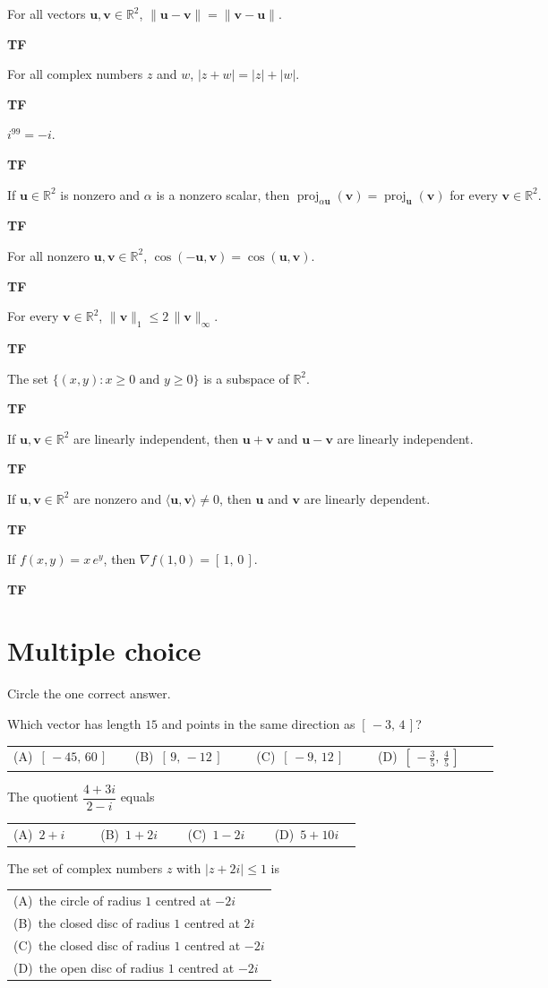\documentclass[11pt]{article}
\makeatletter
\newcommand{\tf}[1]{\parbox[t]{\dimexpr\linewidth-5.5em}{#1}%
  \hfill\textsf{\textbf{T}\qquad\textbf{F}}}
\newcommand{\fourch}[4]{\par\smallskip\noindent
  \begin{tabular}{@{}*{4}{>{\raggedright\arraybackslash}p{0.22\linewidth}}@{}}
  (A)\ #1 & (B)\ #2 & (C)\ #3 & (D)\ #4
  \end{tabular}\par}
\newcommand{\stackch}[4]{\par\smallskip\noindent
  \begin{tabular}{@{}l@{}}
  (A)\ #1 \\[3pt] (B)\ #2 \\[3pt] (C)\ #3 \\[3pt] (D)\ #4
  \end{tabular}\par}
\newcommand{\R}{\mathbb{R}}
\newcommand{\vc}[1]{\mathbf{#1}}
\newcommand{\norm}[1]{\lVert #1\rVert}
\newcommand{\ip}[2]{\langle #1,#2\rangle}
\newcommand{\proj}[2]{\operatorname{proj}_{#1}(#2)}
\newcommand{\grad}{\nabla}
\makeatother
\begin{document}
\begin{tfitems}
  \item \tf{For all vectors $\vc{u},\vc{v}\in\R^{2}$,
        $\norm{\vc{u}-\vc{v}}=\norm{\vc{v}-\vc{u}}$.}
        \vfill
  \item \tf{For all complex numbers $z$ and $w$,
        $\lvert z+w\rvert=\lvert z\rvert+\lvert w\rvert$.}
        \vfill
  \item \tf{$i^{99}=-i$.}
        \vfill
  \item \tf{If $\vc{u}\in\R^{2}$ is nonzero and $\alpha$ is a nonzero scalar,
        then $\proj{\alpha\vc{u}}{\vc{v}}=\proj{\vc{u}}{\vc{v}}$ for every
        $\vc{v}\in\R^{2}$.}
        \vfill
  \item \tf{For all nonzero $\vc{u},\vc{v}\in\R^{2}$,
        $\cos(-\vc{u},\vc{v})=\cos(\vc{u},\vc{v})$.}
        \vfill
\end{tfitems}

\newpage
\begin{tfitems}[start=6]
  \item \tf{For every $\vc{v}\in\R^{2}$,
        $\norm{\vc{v}}_1\le2\,\norm{\vc{v}}_\infty$.}
        \vfill
  \item \tf{The set $\{(x,y) : x\ge0 \text{ and } y\ge0\}$ is a subspace of
        $\R^{2}$.}
        \vfill
  \item \tf{If $\vc{u},\vc{v}\in\R^{2}$ are linearly independent, then
        $\vc{u}+\vc{v}$ and $\vc{u}-\vc{v}$ are linearly independent.}
        \vfill
  \item \tf{If $\vc{u},\vc{v}\in\R^{2}$ are nonzero and
        $\ip{\vc{u}}{\vc{v}}\neq0$, then $\vc{u}$ and $\vc{v}$ are linearly
        dependent.}
        \vfill
  \item \tf{If $f(x,y)=x\,e^{y}$, then $\grad f(1,0)=[\,1,\,0\,]$.}
        \vfill
\end{tfitems}

\newpage
\section{Multiple choice}
Circle the one correct answer.

\begin{tfitems}
  \item Which vector has length $15$ and points in the same direction as
        $[\,-3,\,4\,]$?
        \fourch{$[\,-45,\,60\,]$}
               {$[\,9,\,-12\,]$}
               {$[\,-9,\,12\,]$}
               {$[\,-\tfrac35,\,\tfrac45\,]$}
        \vfill
  \item The quotient $\dfrac{4+3i}{2-i}$ equals
        \fourch{$2+i$}
               {$1+2i$}
               {$1-2i$}
               {$5+10i$}
        \vfill
  \item The set of complex numbers $z$ with $\lvert z+2i\rvert\le1$ is
        \stackch{the circle of radius $1$ centred at $-2i$}
              {the closed disc of radius $1$ centred at $2i$}
              {the closed disc of radius $1$ centred at $-2i$}
              {the open disc of radius $1$ centred at $-2i$}
        \vfill
\end{tfitems}
\end{document}
